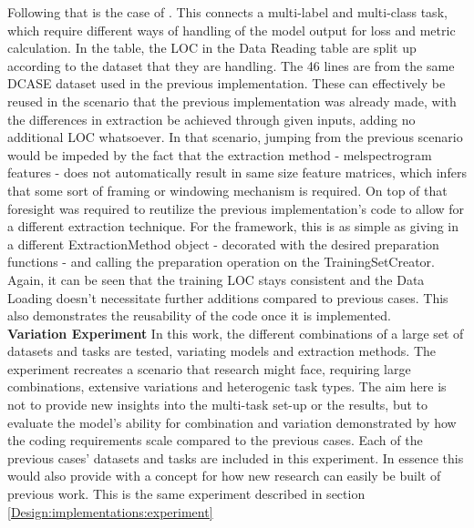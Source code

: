 \textbf{\citet{xu2019multi}} Following that is the case of \citet{xu2019multi}. This connects a multi-label and multi-class task, which require different ways of handling of the model output for loss and metric calculation. In the table, the LOC in the Data Reading table are split up according to the dataset that they are handling. The 46 lines are from the same DCASE dataset used in the previous implementation. These can effectively be reused in the scenario that the previous implementation was already made, with the differences in extraction be achieved through given inputs, adding no additional LOC whatsoever. In that scenario, jumping from the previous scenario would be impeded by the fact that the extraction method - melspectrogram features - does not automatically result in same size feature matrices, which infers that some sort of framing or windowing mechanism is required. On top of that foresight was required to reutilize the previous implementation's code to allow for a different extraction technique. For the framework, this is as simple as giving in a different ExtractionMethod object - decorated with the desired preparation functions - and calling the preparation operation on the TrainingSetCreator. Again, it can be seen that the training LOC stays consistent and the Data Loading doesn't necessitate further additions compared to previous cases. This also demonstrates the reusability of the code once it is implemented.\\

\textbf{Variation Experiment} In this work, the different combinations of a large set of datasets and tasks are tested, variating models and extraction methods. The experiment recreates a scenario that research might face, requiring large combinations, extensive variations and heterogenic task types. The aim here is not to provide new insights into the multi-task set-up or the results, but to evaluate the model's ability for combination and variation demonstrated by how the coding requirements scale compared to the previous cases. Each of the previous cases' datasets and tasks are included in this experiment. In essence this would also provide with a concept for how new research can easily be built of previous work. This is the same experiment described in section \ref{Design:implementations:experiment}\\


